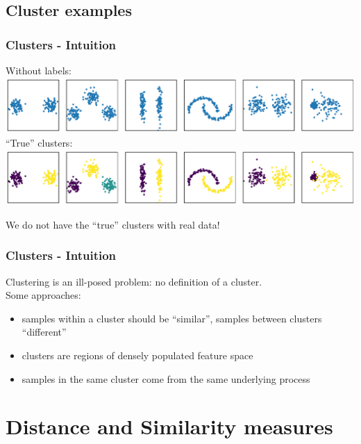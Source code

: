 \documentclass[Nike]{tuberlinbeamer}
\begin{document}
\subsection{Cluster examples}
\begin{frame}
 \frametitle{Clusters - Intuition}
  \begin{center}
    Without labels:
    \centering\includegraphics[width=1.0\textwidth]{sample_clusters.pdf}
    \pause
    ``True'' clusters:
    \centering\includegraphics[width=1.0\textwidth]{sample_clusters_true_assignment.pdf}
  \end{center}
  We do not have the ``true'' clusters with real data!
\end{frame}

\begin{frame}
 \frametitle{Clusters - Intuition}
  Clustering is an ill-posed problem: no definition of a cluster.\\
  Some approaches:
  \begin{itemize}
    \item samples within a cluster should be ``similar'', samples between clusters ``different''
    \item clusters are regions of densely populated feature space
    \item samples in the same cluster come from the same underlying process
  \end{itemize}
\end{frame}


\section{Distance and Similarity measures}
\end{document}

